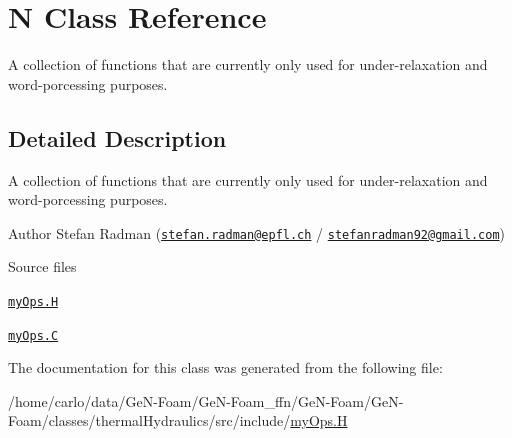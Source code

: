 \hypertarget{classN}{}\section{N Class Reference}
\label{classN}


A collection of functions that are currently only used for under-\/relaxation and word-\/porcessing purposes.  




\subsection{Detailed Description}
A collection of functions that are currently only used for under-\/relaxation and word-\/porcessing purposes. 

\label{_Description}%
 Author Stefan Radman (\href{mailto:stefan.radman@epfl.ch}{\tt stefan.\+radman@epfl.\+ch} / \href{mailto:stefanradman92@gmail.com}{\tt stefanradman92@gmail.\+com})

\begin{DoxyParagraph}{Source files}

\begin{DoxyItemize}
\item \href{../../../home/carlo/data/GeN-Foam/GeN-Foam_ffn/GeN-Foam/GeN-Foam/classes/thermalHydraulics/src/include/myOps.H}{\tt my\+Ops.\+H} 
\item \href{../../../home/carlo/data/GeN-Foam/GeN-Foam_ffn/GeN-Foam/GeN-Foam/classes/thermalHydraulics/src/include/myOps.C}{\tt my\+Ops.\+C} 
\end{DoxyItemize}
\end{DoxyParagraph}


The documentation for this class was generated from the following file\+:\begin{DoxyCompactItemize}
\item 
/home/carlo/data/\+Ge\+N-\/\+Foam/\+Ge\+N-\/\+Foam\+\_\+ffn/\+Ge\+N-\/\+Foam/\+Ge\+N-\/\+Foam/classes/thermal\+Hydraulics/src/include/\hyperlink{myOps_8H}{my\+Ops.\+H}\end{DoxyCompactItemize}
